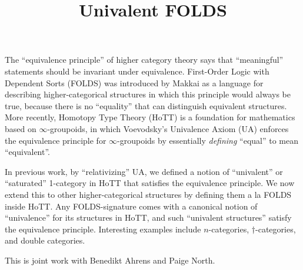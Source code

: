 \documentclass{amsart}
\title{Univalent FOLDS}
\begin{document}
\maketitle

The ``equivalence principle'' of higher category theory says that ``meaningful'' statements should be invariant under equivalence.
First-Order Logic with Dependent Sorts (FOLDS) was introduced by Makkai as a language for describing higher-categorical structures in which this principle would always be true, because there is no ``equality'' that can distinguish equivalent structures.
More recently, Homotopy Type Theory (HoTT) is a foundation for mathematics based on $\infty$-groupoids, in which Voevodsky's Univalence Axiom (UA) enforces the equivalence principle for $\infty$-groupoids by essentially \emph{defining} ``equal'' to mean ``equivalent''.

In previous work, by ``relativizing'' UA, we defined a notion of ``univalent'' or ``saturated'' 1-category in HoTT that satisfies the equivalence principle.
We now extend this to other higher-categorical structures by defining them a la FOLDS inside HoTT.
Any FOLDS-signature comes with a canonical notion of ``univalence'' for its structures in HoTT, and such ``univalent structures'' satisfy the equivalence principle.
Interesting examples include $n$-categories, $\dagger$-categories, and double categories.

This is joint work with Benedikt Ahrens and Paige North.
\end{document}
